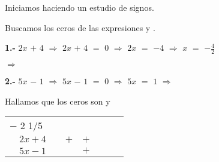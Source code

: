\documentclass[12pt]{article}
\newenvironment{MyColorPar}[1]{%
    \leavevmode\color{#1}\ignorespaces%
}{%
}%
\begin{document}
{} \vspace{0.5cm} 

\begin{MyColorPar}{palatinateblue}
Iniciamos haciendo un estudio de signos.

Buscamos los ceros de las expresiones {} y {} . \vspace{0.5cm}
\end{MyColorPar}

{\bfseries{1.-}} \hspace{0.2cm} $2x$ $+$ $4$ \hspace{0.2cm} $\Longrightarrow$ \hspace{0.2cm} $2x$ $+$ $4$ $=$ $0$ \hspace{0.2cm} $\Longrightarrow$ \hspace{0.2cm} $2x$ $=$ $-4$ \hspace{0.2cm} $\Longrightarrow$ \hspace{0.2cm} $x$ $=$ {\Large{$-\frac{4}{2}$}} \vspace{0.1cm} 

\hspace{1cm} $\Longrightarrow$ \hspace{0.2cm}   \vspace{0.5cm}

{\bfseries{2.-}} \hspace{0.2cm} $5x$ $-$ $1$ \hspace{0.2cm} $\Longrightarrow$ \hspace{0.2cm} $5x$ $-$ $1$ $=$ $0$ \hspace{0.2cm} $\Longrightarrow$ \hspace{0.2cm} $5x$ $=$ $1$ \hspace{0.2cm} $\Longrightarrow$ \hspace{0.2cm}  \vspace{0.5cm}

\begin{MyColorPar}{palatinateblue}
Hallamos que los ceros son {} y  {}
\end{MyColorPar}

\begin{table}[H]
\centering
\begin{tabular}{l|l|l|l|l|l|l|l}
\multicolumn{8}{l}{\hspace{2cm} {\tiny{$-$ 2}} \hspace{.3cm} {\tiny{1/5}}}                                                      \\ 
\cline{2-5}
                        &  $2x + 4$ & {\red{$-$}}  & {\textcolor{verde_manzana}{$+$}}  & {\textcolor{verde_manzana}{$+$}}    \\ 
\cline{2-5}
                        & $5x - 1$ & {\red{$-$}} & {\red{$-$}}  & {\textcolor{verde_manzana}{$+$}}  \\ 
\cline{2-5}
\end{tabular}
\end{table} \vspace{0.5cm}
\end{document}
